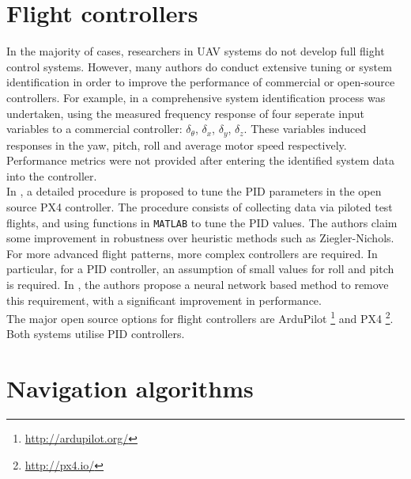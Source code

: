\documentclass[capstone_report.tex]{subfiles}
\begin{document}
\section{Flight controllers}
In the majority of cases, researchers in UAV systems do not develop full flight control systems. However, many authors do conduct extensive tuning or system identification in order to improve the performance of commercial or open-source controllers. For example, in \cite{feicui} a comprehensive system identification process was undertaken, using the measured frequency response of four seperate input variables to a commercial controller: $\delta_\theta$, $\delta_x$, $\delta_y$, $\delta_z$. These variables induced responses in the yaw, pitch, roll and average motor speed respectively. Performance metrics were not provided after entering the identified system data into the controller.\\

In \cite{saengphet}, a detailed procedure is proposed to tune the PID parameters in the open source PX4 controller. The procedure consists of collecting data via piloted test flights, and using functions in \texttt{MATLAB} to tune the PID values. The authors claim some improvement in robustness over heuristic methods such as Ziegler-Nichols.\\

For more advanced flight patterns, more complex controllers are required. In particular, for a PID controller, an assumption of small values for roll and pitch is required. In \cite{wang}, the authors propose a neural network based method to remove this requirement, with a significant improvement in performance.\\

The major open source options for flight controllers are ArduPilot \footnote{\url{http://ardupilot.org/}} and PX4 \footnote{\url{http://px4.io/}}. Both systems utilise PID controllers.\\


\section{Navigation algorithms}
\end{document}
